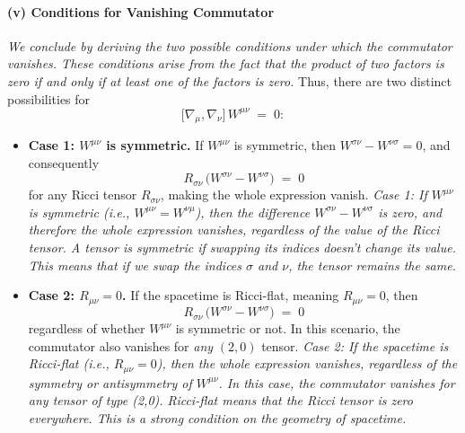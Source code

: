\paragraph{(v) Conditions for Vanishing Commutator}
\textit{We conclude by deriving the two possible conditions under which the commutator vanishes. These conditions arise from the fact that the product of two factors is zero if and only if at least one of the factors is zero.}
Thus, there are two distinct possibilities for
\[
\bigl[\nabla_{\mu}, \nabla_{\nu}\bigr]\,W^{\mu\nu} \;=\; 0:
\]
\begin{itemize}
\item \textbf{Case 1: $W^{\mu\nu}$ is symmetric.} If $W^{\mu\nu}$ is symmetric, then $W^{\sigma\nu} - W^{\nu\sigma} = 0$, and consequently
\[
R_{\sigma\nu}\,\bigl(W^{\sigma\nu} - W^{\nu\sigma}\bigr)\;=\;0
\]
for any Ricci tensor $R_{\sigma\nu}$, making the whole expression vanish.
\textit{Case 1: If \(W^{\mu\nu}\) is symmetric (i.e., \(W^{\mu\nu} = W^{\nu\mu}\)), then the difference \(W^{\sigma\nu} - W^{\nu\sigma}\) is zero, and therefore the whole expression vanishes, regardless of the value of the Ricci tensor. A tensor is symmetric if swapping its indices doesn't change its value.  This means that if we swap the indices \(\sigma\) and \(\nu\), the tensor remains the same.}
\item \textbf{Case 2: $R_{\mu\nu} = 0$.} If the spacetime is Ricci-flat, meaning $R_{\mu\nu}=0$, then
\[
R_{\sigma\nu}\,\bigl(W^{\sigma\nu} - W^{\nu\sigma}\bigr)\;=\;0
\]
regardless of whether $W^{\mu\nu}$ is symmetric or not. In this scenario, the commutator also vanishes for \emph{any} $(2,0)$ tensor.
\textit{Case 2: If the spacetime is Ricci-flat (i.e., \(R_{\mu\nu} = 0\)), then the whole expression vanishes, regardless of the symmetry or antisymmetry of \(W^{\mu\nu}\). In this case, the commutator vanishes for any tensor of type (2,0). Ricci-flat means that the Ricci tensor is zero everywhere. This is a strong condition on the geometry of spacetime.}
\end{itemize}

